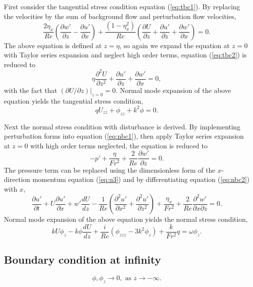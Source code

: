 First consider the tangential stress condition equation (\ref{eq:tbc1}). By replacing the velocities by the sum of background flow and perturbation flow velocities,
\begin{equation}
     \frac{2\eta _{x}}{Re}\left(\frac{\partial w'}{\partial z} -\frac{\partial u'}{\partial x}\right) +\frac{\left( 1-\eta _{x}^{2}\right)}{Re}\left(\frac{\partial U}{\partial z} +\frac{\partial u'}{\partial z} +\frac{\partial w'}{\partial x}\right) =0.
    \label{eq:tbc2}
\end{equation}
The above equation is defined at $z=\eta$, so again we expand the equation at $z=0$ with Taylor series expansion and neglect high order terms, equation (\ref{eq:tbc2}) is reduced to
\begin{equation}
    \eta \frac{\partial ^{2} U}{\partial z^{2}} +\frac{\partial u'}{\partial z} +\frac{\partial w'}{\partial x} =0,
\end{equation}
with the fact that $\left.(\partial U/\partial z)\right|_{z=0}=0$. Normal mode expansion of the above equation yields the tangential stress condition,
\begin{equation}
    qU_{zz} +\phi _{zz} +k^{2} \phi =0.
    \label{eq:tbc}
\end{equation}

Next the normal stress condition with disturbance is derived. By implementing perturbation forms into equation (\ref{eq:nbc1}), then apply Taylor series expansion at $z=0$ with high order terms neglected, the equation is reduced to
\begin{equation}
-p'+\frac{\eta }{Fr^{2}} +\frac{2}{Re}\frac{\partial w'}{\partial z} = 0.
    \label{eq:nbc2}
\end{equation}
The pressure term can be replaced using the dimensionless form of the $x$-direction momentum equation (\ref{eq:u3}) and by differentiating equation (\ref{eq:nbc2}) with $x$,
\begin{equation}
    {\displaystyle \frac{\partial u'}{\partial t} +U\frac{\partial u'}{\partial x} +w'\frac{dU}{dz}} -{\displaystyle \frac{1}{Re}\left(\frac{\partial ^{2} u'}{\partial x^{2}} +\frac{\partial ^{2} u'}{\partial z^{2}}\right)} +\frac{\eta _{x}}{Fr^{2}} +\frac{2}{Re}\frac{\partial ^{2} w'}{\partial x\partial z} = 0.
    \label{eq:nbc4}
\end{equation}
Normal mode expansion of the above equation yields the normal stress condition,
\begin{equation}
    {\displaystyle kU\phi _{z} -k\phi \frac{dU}{dz} +\frac{i}{Re}\left( \phi _{zzz} -3k^{2} \phi _{z}\right) +}\frac{k}{Fr^{2}}q ={\displaystyle \omega \phi _{z}}.
    \label{eq:nbc}
\end{equation}

\subsection{Boundary condition at infinity}
\begin{equation}
    \phi,\phi_z\rightarrow 0, \text{ as } z\rightarrow -\infty.
    \label{eq:bbcs}
\end{equation}